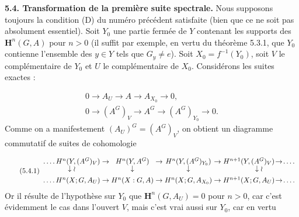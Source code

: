 \bigskip
\textbf{5.4. Transformation de la première suite spectrale.} Nous
supposons toujours la condition (D) du numéro précédent satisfaite (bien que
ce ne soit pas absolument essentiel).
Soit $Y_0$ une partie fermée de $Y$ contenant les supports des
$\mathbf H^n(G,A)$ pour $n>0$ (il suffit par exemple, en vertu du théorème
5.3.1, que $Y_0$ contienne l'ensemble des $y\in Y$ tels que $G_y\ne e$). Soit
$X_0=f^{-1}(Y_0)$, soit $V$ le complémentaire de $Y_0$ et $U$ le
complémentaire de $X_0$. Considérons les suites exactes :

\[
\begin{gathered}
0\to A_U\to A\to A_{X_0}\to0,\\
0\to(A^G)_V\to A^G\to
  (A^G)_{Y_0}\to0.
\end{gathered}
\]
Comme on a manifestement $(A_U)^G=(A^G)_V$, on obtient un diagramme
commutatif de suites de cohomologie

\[
\tag{5.4.1}
\begin{array}{c@{\;}c@{\;}c@{\;}c@{\;}c@{\;}c@{\;}c}
\mathinner{.\,.\,.\,.}H^n(Y,(A^G)_V)&\to&H^n(Y,A^G)&\to&H^n(Y,(A^G)_{Y_0})&\to&
H^{n+1}(Y,(A^G)_V)\!\to\!\mathinner{.\,.\,.\,.}\\[-0.2em]
\downarrow\wr&&\downarrow&&\downarrow&&\downarrow\wr\\[0.45em]
\mathinner{.\,.\,.\,.}H^n(X;G,A_U)&\to&H^n(X:G,A)&\to&H^n(X;G,A_{X_0})&\to&
H^{n+1}(X;G,A_U)\!\to\!\mathinner{.\,.\,.\,.}
\end{array}
\]
Or il résulte de l'hypothèse sur $Y_0$ que $\mathbf H^n(G,A_U)=0$ pour $n>0$,
car c'est évidemment le cas dans l'ouvert $V$, mais c'est vrai aussi sur
$Y_0$, car en vertu

